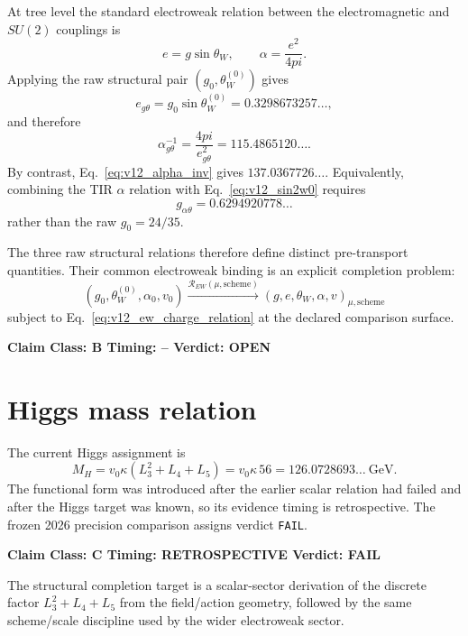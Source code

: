 \documentclass[11pt,a4paper,twoside]{book}
\def\pi{pi}%
\theoremstyle{definition}
\newcommand{\vTwelveStatus}[3]{\par\noindent\textbf{Claim Class: #1 \quad Timing: #2 \quad Verdict: #3}\par}
\begin{document}
At tree level the standard electroweak relation between the electromagnetic and $SU(2)$ couplings is
\begin{equation}
e=g\sin\theta_W,
\qquad
\alpha=\frac{e^2}{4\pi}.
\label{eq:v12_ew_charge_relation}
\end{equation}
Applying the raw structural pair $(g_0,\theta_W^{(0)})$ gives
\begin{equation}
e_{g\theta}=g_0\sin\theta_W^{(0)}
=0.3298673257\ldots,
\end{equation}
and therefore
\begin{equation}
\boxed{
\alpha_{g\theta}^{-1}
=\frac{4\pi}{e_{g\theta}^2}
=115.4865120\ldots .
}
\label{eq:v12_alpha_from_gtheta}
\end{equation}
By contrast, Eq.~\eqref{eq:v12_alpha_inv} gives $137.0367726\ldots$. Equivalently, combining the TIR $\alpha$ relation with Eq.~\eqref{eq:v12_sin2w0} requires
\begin{equation}
\boxed{g_{\alpha\theta}=0.6294920778\ldots}
\end{equation}
rather than the raw $g_0=24/35$.

The three raw structural relations therefore define distinct pre-transport quantities. Their common electroweak binding is an explicit completion problem:
\begin{equation}
\boxed{
(g_0,\theta_W^{(0)},\alpha_0,v_0)
\xrightarrow{\mathcal R_{EW}(\mu,\mathrm{scheme})}
(g,e,\theta_W,\alpha,v)_{\mu,\mathrm{scheme}}
}
\label{eq:v12_ew_full_closure}
\end{equation}
subject to Eq.~\eqref{eq:v12_ew_charge_relation} at the declared comparison surface.
\vTwelveStatus{B}{--}{OPEN}

\section{Higgs mass relation}

The current Higgs assignment is
\begin{equation}
\boxed{
M_H=v_0\kappa(L_3^2+L_4+L_5)
=v_0\kappa\,56
=126.0728693\ldots\ \mathrm{GeV}.
}
\label{eq:v12_higgs_mass}
\end{equation}
The functional form was introduced after the earlier scalar relation had failed and after the Higgs target was known, so its evidence timing is retrospective. The frozen 2026 precision comparison assigns verdict \texttt{FAIL}.
\vTwelveStatus{C}{RETROSPECTIVE}{FAIL}

The structural completion target is a scalar-sector derivation of the discrete factor $L_3^2+L_4+L_5$ from the field/action geometry, followed by the same scheme/scale discipline used by the wider electroweak sector.
\end{document}
